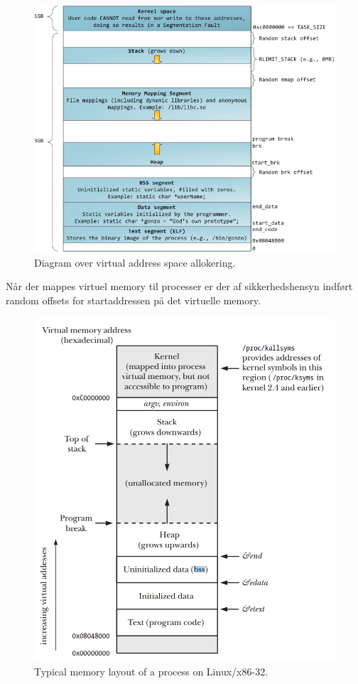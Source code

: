 \begin{figure}[H]
	\centering
	\includegraphics[width=\linewidth]{figs/memorydiagram}
	\caption{Diagram over virtual address space allokering.}
	\label{fig:memorydiagram}
\end{figure}

Når der mappes virtuel memory til processer er der af sikkerhedshensyn indført random offsets for startaddressen på det virtuelle memory.\\

\begin{figure}
	\centering
	\includegraphics[width=0.7\linewidth]{figs/virtualaddressspace}
	\caption{Typical memory layout of a process on Linux/x86-32.}
	\label{fig:virtualaddressspace}
\end{figure}


